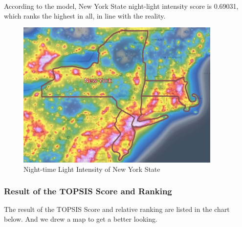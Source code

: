 According to the model, New York State night-light intensity score is 0.69031, which ranks the highest in all, in line with the reality.

\begin{figure}[H]\centering
    \includegraphics[width=0.9\textwidth]{figures/texted/New_York.jpg}
    \caption{Night-time Light Intensity of New York State} \label{fig:figure5}
\end{figure}

\subsubsection{Result of the TOPSIS Score and Ranking}

The result of the TOPSIS Score and relative ranking are listed in the chart below. And we drew a map to get a better looking.

